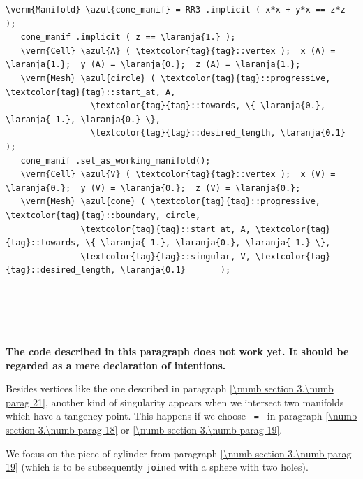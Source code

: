 \begin{Verbatim}[commandchars=\\\{\},formatcom=\small\tt,frame=single,
   label=code not working,rulecolor=\color{coment},
   baselinestretch=0.94,framesep=2mm                                  ]
   \verm{Manifold} \azul{cone_manif} = RR3 .implicit ( x*x + y*x == z*z );
   cone_manif .implicit ( z == \laranja{1.} );
   \verm{Cell} \azul{A} ( \textcolor{tag}{tag}::vertex );  x (A) = \laranja{1.};  y (A) = \laranja{0.};  z (A) = \laranja{1.};
   \verm{Mesh} \azul{circle} ( \textcolor{tag}{tag}::progressive, \textcolor{tag}{tag}::start_at, A,
                 \textcolor{tag}{tag}::towards, \{ \laranja{0.}, \laranja{-1.}, \laranja{0.} \},
                 \textcolor{tag}{tag}::desired_length, \laranja{0.1}           );
   cone_manif .set_as_working_manifold();
   \verm{Cell} \azul{V} ( \textcolor{tag}{tag}::vertex );  x (V) = \laranja{0.};  y (V) = \laranja{0.};  z (V) = \laranja{0.};
   \verm{Mesh} \azul{cone} ( \textcolor{tag}{tag}::progressive, \textcolor{tag}{tag}::boundary, circle,
               \textcolor{tag}{tag}::start_at, A, \textcolor{tag}{tag}::towards, \{ \laranja{-1.}, \laranja{0.}, \laranja{-1.} \},
               \textcolor{tag}{tag}::singular, V, \textcolor{tag}{tag}::desired_length, \laranja{0.1}       );
\end{Verbatim}


\section{~~}\label{\numb section 3.\numb parag 22}

{\normalfont\bfseries The code described in this paragraph does not work yet.
It should be regarded as a mere declaration of intentions.}
\medskip

Besides vertices like the one described in paragraph \ref{\numb section 3.\numb parag 21},
another kind of singularity appears when we intersect two manifolds which have a tangency point.
This happens if we choose {\small\tt{} = } in paragraph
\ref{\numb section 3.\numb parag 18} or \ref{\numb section 3.\numb parag 19}.

We focus on the piece of cylinder from paragraph \ref{\numb section 3.\numb parag 19}
(which is to be subsequently {\small\tt join}ed with a sphere with two holes).

